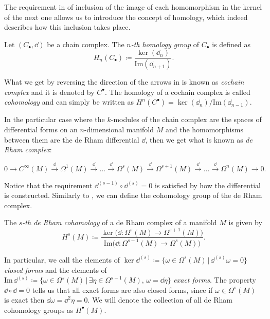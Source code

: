 The requirement in  of inclusion of the image of each homomorphism in the kernel of the next one allows us to introduce the concept of homology, which indeed describes how this inclusion takes place.

\begin{definition}
\label{def:homology}
    Let $(C_{\bullet}, \dd )$ be a chain complex.
    The \emph{$n$-th homology group} of $C_{\bullet}$ is defined as
    \begin{equation*}
        H_n (C_\bullet) \coloneqq \frac{\ker (\dd_n)}{\text{Im} (\dd_{n+1})}.
    \end{equation*}
\end{definition}

What we get by reversing the direction of the arrows in  is known as \emph{cochain complex} and it is denoted by $C^\bullet$.
The homology of a cochain complex is called \emph{cohomology} and can simply be written as $H^n (C^\bullet) = {\ker (\dd_n)} / {\text{Im} (\dd_{n-1})}$.

In the particular case where the $k$-modules of the chain complex are the spaces of differential forms on an $n$-dimensional manifold $M$ and the homomorphisms between them are the de Rham differential $\dd$, then we get what is known as \emph{de Rham complex}:

\begin{equation*}
    0 \rightarrow C^\infty(M) \xrightarrow{\dd} \Omega^1(M)
    \xrightarrow{\dd} \ldots \xrightarrow{\dd} \Omega^s(M)
    \xrightarrow{\dd} \Omega^{s+1}(M) \xrightarrow{\dd} \ldots 
    \xrightarrow{\dd} \Omega^n(M)\rightarrow 0 .
\end{equation*}

Notice that the requirement $\! \dd^{(s-1)} \circ \dd^{(s)} = 0$ is satisfied by how the differential is constructed.
Similarly to , we can define the cohomology group of the de Rham complex.

\begin{definition}
    The \emph{$s$-th de Rham cohomology} of a de Rham complex of a manifold $M$ is given by
    \begin{equation*}
        H^s(M) \coloneqq \frac{\ker \Big( \dd : \Omega^s(M) \rightarrow \Omega^{s+1}(M)  \Big)}
        {\text{Im}\Big( \dd : \Omega^{s-1}(M) \rightarrow \Omega^{s}(M)  \Big)} .
    \end{equation*}
\end{definition}

In particular, we call the elements of $\ker \dd ^{(s)} \coloneqq \{ \omega \in \Omega^s(M) \, | \, \dd ^{(s)} \omega = 0\}$ \emph{closed forms} and the elements of $\text{Im} \, \dd ^{(s)} \coloneqq \{ \omega \in \Omega^s(M) \, | \, \exists \eta \in \Omega^{s-1}(M), \, \omega = \dd \eta \}$ \emph{exact forms}.
The property $\dd \circ \dd = 0$ tells us that all exact forms are also closed forms, since if $\omega \in \Omega^s(M)$ is exact then $\dd \omega = \dd ^2 \eta = 0$.
We will denote the collection of all de Rham cohomology groups as $H^\bullet(M)$.
